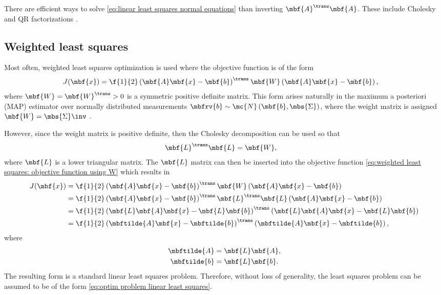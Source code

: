\documentclass[ nobib, nofonts, notoc]{tufte-handout}
\begin{document}
    There are efficient ways to solve \eqref{eq:linear least squares normal equations} than inverting $\mbf{A}^{\trans}\mbf{A}$. These include Cholesky and QR factorizations \cite{Golub_Matrix_2013,Dellaert_Factor_2017}.


    \subsection{Weighted least squares}
    Most often, weighted least squares optimization is used where the objective function is of the form
    \begin{align}
        \label{eq:weighted least squares: objective function using W}
        J(\mbf{x}) &= \f{1}{2}\left( \mbf{A}\mbf{x} - \mbf{b} \right)^{\trans}\mbf{W}\left(  \mbf{A}\mbf{x} - \mbf{b}\right),
    \end{align}
    where $\mbf{W}=\mbf{W}^{\trans}>0$ is a symmetric positive definite matrix. 
    This form arises naturally in the maximum a posteriori (MAP) estimator over normally distributed measurements $\mbfrv{b}\sim\mc{N}\left( \mbf{b}, \mbs{\Sigma} \right)$, where the weight matrix is assigned $\mbf{W} = \mbs{\Sigma}\inv$ \cite{Barfoot_State_2017a}.

    However, since the weight matrix is positive definite, then the Cholesky decomposition can be used so that
    \begin{align}
        \mbf{L}^{\trans}\mbf{L} &= \mbf{W},
    \end{align}
    where $\mbf{L}$ is a lower triangular matrix. The $\mbf{L}$ matrix can then be inserted into the objective function \eqref{eq:weighted least squares: objective function using W} which results in
    \begin{align}
        J(\mbf{x}) 
        &= \f{1}{2}\left( \mbf{A}\mbf{x} - \mbf{b} \right)^{\trans}\mbf{W}\left(  \mbf{A}\mbf{x} - \mbf{b}\right)\\
        &=\f{1}{2}\left( \mbf{A}\mbf{x} - \mbf{b} \right)^{\trans}\mbf{L}^{\trans}\mbf{L}\left(  \mbf{A}\mbf{x} - \mbf{b}\right)\\
        &= \f{1}{2}\left( \mbf{L}\mbf{A}\mbf{x} - \mbf{L}\mbf{b} \right)^{\trans}\left( \mbf{L}\mbf{A}\mbf{x} - \mbf{L}\mbf{b}\right)\\
        &= \f{1}{2}\left( \mbftilde{A}\mbf{x} - \mbftilde{b} \right)^{\trans}\left( \mbftilde{A}\mbf{x} - \mbftilde{b}\right),
    \end{align}
    where 
    \begin{align}
        \mbftilde{A} &= \mbf{L}\mbf{A},\\
        \mbftilde{b} &= \mbf{L}\mbf{b}.
    \end{align}
    The resulting form is a standard linear least squares problem.
    Therefore, without loss of generality, the least squares problem can be assumed to be of the form \eqref{eq:optim problem linear least squares}.
\end{document}
